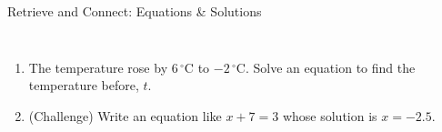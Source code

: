 \documentclass{beamer}
\newcommand{\ashow}[1]{\uncover<2->{\textcolor{red}{\small #1}}}
\newcommand{\tightlist}{%
  \setlength{\itemsep}{0pt}\setlength{\parskip}{0pt}\setlength{\topsep}{0pt}%
}
\newenvironment{subqs}
  {\begin{enumerate}\tightlist\setcounter{enumii}{\value{enumi}}}
  {\setcounter{enumi}{\value{enumii}}\end{enumerate}}
\newcommand{\dC}[1]{$#1\,^{\circ}$C}
\begin{document}
\begin{frame}[t]{Retrieve and Connect: Equations \& Solutions}
\begin{columns}[T,onlytextwidth]
\begin{enumerate}
\begin{subqs}
  \end{subqs}
  \item The temperature rose by \dC{6} to \dC{-2}. Solve an equation to find
        the temperature before, $t$.
        \ashow{$t+6=-2$, \; $t=-8$}
  \item (Challenge) Write an equation like $x+7=3$ whose solution is
        $x=-2.5$.
        \ashow{For example $x+4=1.5$}
\end{enumerate}
\end{columns}
\end{frame}

\end{document}
